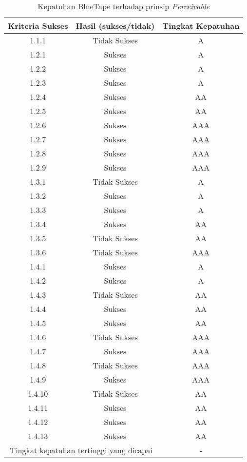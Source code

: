 \begin{table}[H]
    \centering 
    \caption{Kepatuhan BlueTape terhadap prinsip \textit{Perceivable}}
    \label{tab:kepatuhan_bluetape_perceivable}
    \begin{tabular}{|c|c|c|}
        \toprule
        Kriteria Sukses & Hasil (sukses/tidak) & Tingkat Kepatuhan \\

        \midrule
        \rowcolor{darkred} 1.1.1 & Tidak Sukses & A \\
        1.2.1 & Sukses & A \\
        1.2.2 & Sukses & A \\
        1.2.3 & Sukses & A \\
        1.2.4 & Sukses & AA \\
        1.2.5 & Sukses & AA \\
        1.2.6 & Sukses & AAA \\
        1.2.7 & Sukses & AAA \\
        1.2.8 & Sukses & AAA \\
        1.2.9 & Sukses & AAA \\
        \rowcolor{darkred} 1.3.1 & Tidak Sukses & A \\
        1.3.2 & Sukses & A \\
        1.3.3 & Sukses & A \\
        1.3.4 & Sukses & AA \\
        \rowcolor{brightred} 1.3.5 & Tidak Sukses & AA \\
        \rowcolor{pink} 1.3.6 & Tidak Sukses & AAA \\
        1.4.1 & Sukses & A \\
        1.4.2 & Sukses & A \\
        \rowcolor{brightred} 1.4.3 & Tidak Sukses & AA \\
        1.4.4 & Sukses & AA \\
        1.4.5 & Sukses & AA \\
        \rowcolor{pink} 1.4.6 & Tidak Sukses & AAA \\
        1.4.7 & Sukses & AAA \\
        \rowcolor{pink} 1.4.8 & Tidak Sukses & AAA \\
        1.4.9 & Sukses & AAA \\
        \rowcolor{brightred} 1.4.10 & Tidak Sukses & AA \\
        1.4.11 & Sukses & AA \\
        1.4.12 & Sukses & AA \\
        1.4.13 & Sukses & AA \\
        
        \bottomrule
        \multicolumn{2}{|c|}{Tingkat kepatuhan tertinggi yang dicapai} & - \\
        \bottomrule

    \end{tabular}
\end{table}
